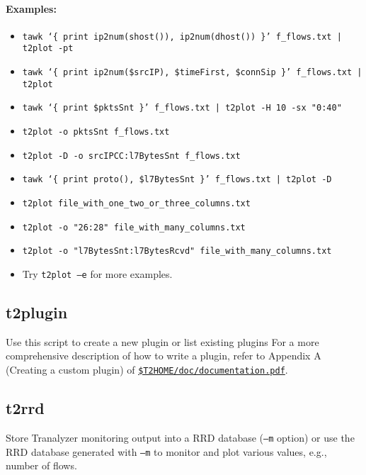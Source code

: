 \documentclass[documentation]{subfiles}
\begin{document}
\paragraph{Examples:}
\begin{itemize}
    \item {\tt tawk `\{ print ip2num(shost()), ip2num(dhost()) \}' f\_flows.txt | t2plot -pt}
    \item {\tt tawk `\{ print ip2num(\$srcIP), \$timeFirst, \$connSip \}' f\_flows.txt | t2plot}
    \item {\tt tawk `\{ print \$pktsSnt \}' f\_flows.txt | t2plot -H 10 -sx "0:40"}
    \item {\tt t2plot -o pktsSnt f\_flows.txt}
    \item {\tt t2plot -D -o srcIPCC:l7BytesSnt f\_flows.txt}
    \item {\tt tawk `\{ print proto(), \$l7BytesSnt \}' f\_flows.txt | t2plot -D}
    \item {\tt t2plot file\_with\_one\_two\_or\_three\_columns.txt}
    \item {\tt t2plot -o "26:28" file\_with\_many\_columns.txt}
    \item {\tt t2plot -o "l7BytesSnt:l7BytesRcvd" file\_with\_many\_columns.txt}
    \item Try {\tt t2plot --e} for more examples.
\end{itemize}

\subsection{t2plugin}\label{t2plugin}
Use this script to create a new plugin or list existing plugins
For a more comprehensive description of how to write a plugin, refer to Appendix A (Creating a custom plugin) of \href{../../doc/documentation.pdf}{\tt \$T2HOME/doc/documentation.pdf}.

\subsection{t2rrd}\label{s:t2rrd}
Store Tranalyzer monitoring output into a RRD database ({\tt --m} option) or use the RRD database generated with {\tt --m} to monitor and plot various values, e.g., number of flows.
\end{document}
